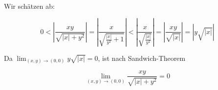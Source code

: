 \documentclass[a4paper,german,12pt,smallheadings]{scrartcl}
\begin{document}
Wir schätzen ab:

\begin{equation*}
  0 <
  \left| \frac{xy}{\sqrt{|x| + y^2}}          \right| =
  \left| \frac{x}{\sqrt{\frac{|x|}{y^2} + 1}} \right| <
  \left| \frac{x}{\sqrt{\frac{|x|}{y^2}}}     \right| =
  \left| \frac{xy}{\sqrt{|x|}}                \right| =
  \left| y\sqrt{|x|}                          \right|
\end{equation*}

Da $\lim_{(x,y) \to (0,0)} y\sqrt{|x|} = 0$, ist nach Sandwich-Theorem

\begin{equation*}
  \lim_{(x,y) \to (0,0)} \frac{xy}{\sqrt{|x| + y^2}} = 0
\end{equation*}
\end{document}

